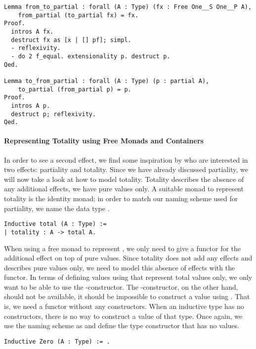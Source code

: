 \begin{verbatim}
Lemma from_to_partial : forall (A : Type) (fx : Free One__S One__P A),
    from_partial (to_partial fx) = fx.
Proof.
  intros A fx.
  destruct fx as [x | [] pf]; simpl.
  - reflexivity.
  - do 2 f_equal. extensionality p. destruct p.
Qed.

Lemma to_from_partial : forall (A : Type) (p : partial A),
    to_partial (from_partial p) = p.
Proof.
  intros A p.
  destruct p; reflexivity.
Qed.
\end{verbatim}

\paragraph{Representing Totality using Free Monads and Containers}
\label{par:totality_container}
In order to see a second effect, we find some inspiration by
\citet{abel2005verifying} who are interested in two effects:
partiality and totality.
Since we have already discussed partiality, we will now take a look at
how to model totality.
Totality describes the absence of any additional effects, we have pure
values only.
A suitable monad to represent totality is the identity monad; in order
to match our naming scheme used for partiality, we name the data type
.

\begin{verbatim}
Inductive total (A : Type) :=
| totality : A -> total A.
\end{verbatim}

When using a free monad to represent , we only need to
give a functor for the additional effect on top of pure values.
Since totality does not add any effects and describes pure values
only, we need to model this absence of effects with the functor.
In terms of defining values using  that represent total
values only, we only want to be able to use the
-constructor.
The -constructor, on the other hand, should not be
available, it should be impossible to construct a value using
.
That is, we need a functor without any constructors.
When an inductive type has no constructors, there is no way to
construct a value of that type.
Once again, we use the naming scheme as \citeauthor{swierstra2008data}
and define the type constructor  that has no values.

\begin{verbatim}
Inductive Zero (A : Type) := .
\end{verbatim}

